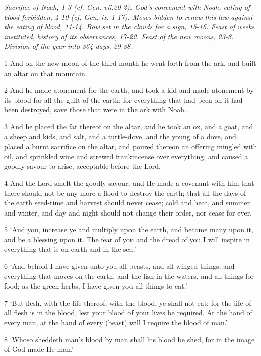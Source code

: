 \par \textit{Sacrifice of Noah, 1-3 (cf. Gen. vii.20-2). God's convenant with Noah, eating of blood forbidden, 4-10 (cf. Gen. ix. 1-17). Moses bidden to renew this law against the eating of blood, 11-14. Bow set in the clouds for a sign, 15-16. Feast of weeks instituted, history of its observances, 17-22. Feast of the new moons, 23-8. Division of the year into 364 days, 29-38.}

\par 1 And on the new moon of the third month he went forth from the ark, and built an altar on that mountain.
\par 2 And he made atonement for the earth, and took a kid and made atonement by its blood for all the guilt of the earth; for everything that had been on it had been destroyed, save those that were in the ark with Noah.
\par 3 And he placed the fat thereof on the altar, and he took an ox, and a goat, and a sheep and kids, and salt, and a turtle-dove, and the young of a dove, and placed a burnt sacrifice on the altar, and poured thereon an offering mingled with oil, and sprinkled wine and strewed frankincense over everything, and caused a goodly savour to arise, acceptable before the Lord.
\par 4 And the Lord smelt the goodly savour, and He made a covenant with him that there should not be any more a flood to destroy the earth; that all the days of the earth seed-time and harvest should never cease; cold and heat, and summer and winter, and day and night should not change their order, nor cease for ever.
\par 5 ‘And you, increase ye and multiply upon the earth, and become many upon it, and be a blessing upon it. The fear of you and the dread of you I will inspire in everything that is on earth and in the sea.’
\par 6 ‘And behold I have given unto you all beasts, and all winged things, and everything that moves on the earth, and the fish in the waters, and all things for food; as the green herbs, I have given you all things to eat.’
\par 7 ‘But flesh, with the life thereof, with the blood, ye shall not eat; for the life of all flesh is in the blood, lest your blood of your lives be required. At the hand of every man, at the hand of every (beast) will I require the blood of man.’
\par 8 ‘Whoso sheddeth man's blood by man shall his blood be shed, for in the image of God made He man.’
